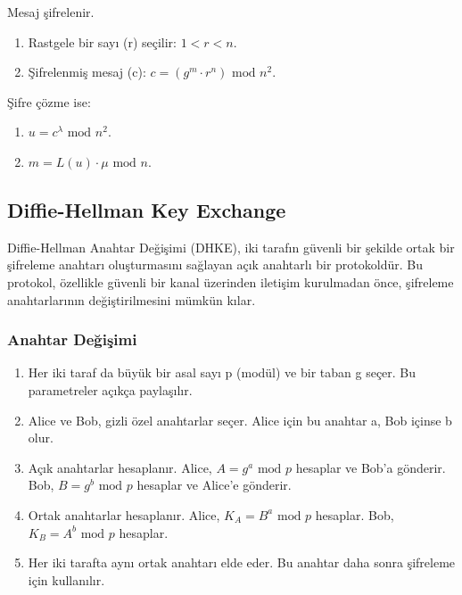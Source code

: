 Mesaj şifrelenir.

\begin{enumerate}
    \item Rastgele bir sayı (r) seçilir: $1 < r < n$.
    \item Şifrelenmiş mesaj (c): $c = (g^m \cdot r^n) \text{ mod } n^2$.
\end{enumerate}

Şifre çözme ise:

\begin{enumerate}
    \item $u = c^{\lambda} \text{ mod } n^2$.
    \item $m = L(u) \cdot \mu \text{ mod } n$.
\end{enumerate}

\newpage

\subsection{Diffie-Hellman Key Exchange}

Diffie-Hellman Anahtar Değişimi (DHKE), iki tarafın güvenli bir şekilde ortak bir şifreleme anahtarı oluşturmasını sağlayan açık anahtarlı bir protokoldür. Bu protokol, özellikle güvenli bir kanal üzerinden iletişim kurulmadan önce, şifreleme anahtarlarının değiştirilmesini mümkün kılar.

\subsubsection{Anahtar Değişimi}

\begin{enumerate}
    \item Her iki taraf da büyük bir asal sayı p (modül) ve bir taban g seçer. Bu parametreler açıkça paylaşılır.
    \item Alice ve Bob, gizli özel anahtarlar seçer. Alice için bu anahtar a, Bob içinse b olur.
    \item Açık anahtarlar hesaplanır. Alice, $A = g^a \text{ mod } p$ hesaplar ve Bob'a gönderir. Bob, $B = g^b \text{ mod } p$ hesaplar ve Alice'e gönderir.
    \item Ortak anahtarlar hesaplanır. Alice, $K_A = B^a \text{ mod } p$ hesaplar. Bob, $K_B = A^b \text{ mod } p$ hesaplar.
    \item Her iki tarafta aynı ortak anahtarı elde eder. Bu anahtar daha sonra şifreleme için kullanılır.
\end{enumerate}

